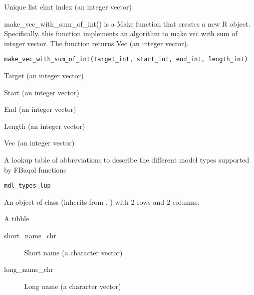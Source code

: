 \documentclass[a4paper]{book}
\begin{document}
\begin{Value}
Unique list elmt index (an integer vector)
\end{Value}
%
\begin{Description}\relax
make\_vec\_with\_sum\_of\_int() is a Make function that creates a new R object. Specifically, this function implements an algorithm to make vec with sum of integer vector. The function returns Vec (an integer vector).
\end{Description}
%
\begin{Usage}
\begin{verbatim}
make_vec_with_sum_of_int(target_int, start_int, end_int, length_int)
\end{verbatim}
\end{Usage}
%
\begin{Arguments}
\begin{ldescription}
\item[\code{target\_int}] Target (an integer vector)

\item[\code{start\_int}] Start (an integer vector)

\item[\code{end\_int}] End (an integer vector)

\item[\code{length\_int}] Length (an integer vector)
\end{ldescription}
\end{Arguments}
%
\begin{Value}
Vec (an integer vector)
\end{Value}
%
\begin{Description}\relax
A lookup table of abbreviations to describe the different model types supported by FBaqol functions
\end{Description}
%
\begin{Usage}
\begin{verbatim}
mdl_types_lup
\end{verbatim}
\end{Usage}
%
\begin{Format}
An object of class  (inherits from , ) with 2 rows and 2 columns.
\end{Format}
%
\begin{Details}\relax
A tibble

\begin{description}

\item[short\_name\_chr] Short name (a character vector)
\item[long\_name\_chr] Long name (a character vector)

\end{description}

\end{Details}
\end{document}
